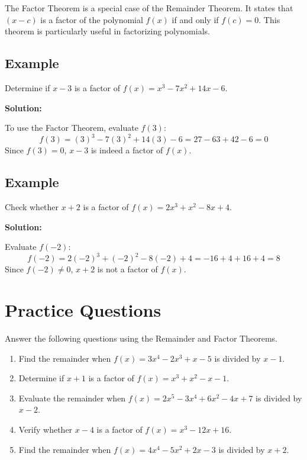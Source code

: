 \documentclass[12pt]{article}
\begin{document}
The Factor Theorem is a special case of the Remainder Theorem. It states that $(x - c)$ is a factor of the polynomial $f(x)$ if and only if $f(c) = 0$. This theorem is particularly useful in factorizing polynomials.

\subsection*{Example}

Determine if $x - 3$ is a factor of $f(x) = x^3 - 7x^2 + 14x - 6$.

\textbf{Solution:}

To use the Factor Theorem, evaluate $f(3)$:
\[
f(3) = (3)^3 - 7(3)^2 + 14(3) - 6 = 27 - 63 + 42 - 6 = 0
\]
Since $f(3) = 0$, $x - 3$ is indeed a factor of $f(x)$.

\subsection*{Example}

Check whether $x + 2$ is a factor of $f(x) = 2x^3 + x^2 - 8x + 4$.

\textbf{Solution:}

Evaluate $f(-2)$:
\[
f(-2) = 2(-2)^3 + (-2)^2 - 8(-2) + 4 = -16 + 4 + 16 + 4 = 8
\]
Since $f(-2) \neq 0$, $x + 2$ is not a factor of $f(x)$.

\vfill

\newpage

\section*{Practice Questions}

Answer the following questions using the Remainder and Factor Theorems.

\begin{enumerate}
    \item Find the remainder when $f(x) = 3x^4 - 2x^3 + x - 5$ is divided by $x - 1$.
    \item Determine if $x + 1$ is a factor of $f(x) = x^3 + x^2 - x - 1$.
    \item Evaluate the remainder when $f(x) = 2x^5 - 3x^4 + 6x^2 - 4x + 7$ is divided by $x - 2$.
    \item Verify whether $x - 4$ is a factor of $f(x) = x^3 - 12x + 16$.
    \item Find the remainder when $f(x) = 4x^4 - 5x^2 + 2x - 3$ is divided by $x + 2$.
\end{enumerate}
\end{document}
